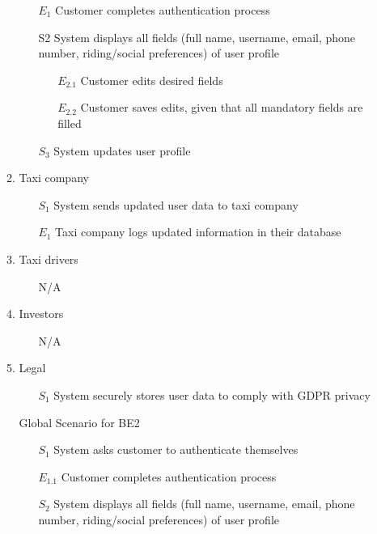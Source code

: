 \documentclass[]{article}
\begin{document}
\begin{enumerate}[{\textbf{BE}}1.]
\begin{enumerate}[{VP2}.1]
\begin{enumerate}
                    \item[$E_1$] Customer completes authentication process
                \item[S2] System displays all fields (full name, username, email, phone number, riding/social preferences) of user profile
                \begin{enumerate}
                    \item[$E_{2.1}$] Customer edits desired fields
                    \item[$E_{2.2}$] Customer saves edits, given that all mandatory fields are filled
                \end{enumerate}
                \item[$S_3$] System updates user profile
            \end{enumerate}
        \item Taxi company
            \begin{enumerate}
                \item[$S_1$] System sends updated user data to taxi company
                \item[$E_1$] Taxi company logs updated information in their database
            \end{enumerate}
        \item Taxi drivers
            \begin{enumerate}
                \item[N/A]
            \end{enumerate}
        \item Investors
            \begin{enumerate}
                \item[N/A]
            \end{enumerate}
        \item Legal
            \begin{enumerate}
                \item[$S_1$] System securely stores user data to comply with GDPR privacy
            \end{enumerate}
        \item[Global] Scenario for BE2
            \begin{enumerate}
                \item[$S_1$] System asks customer to authenticate themselves
                    \item[$E_{1.1}$] Customer completes authentication process
                \item[$S_2$] System displays all fields (full name, username, email, phone number, riding/social preferences) of user profile

\end{enumerate}
\end{enumerate}
\end{enumerate}
\end{document}
